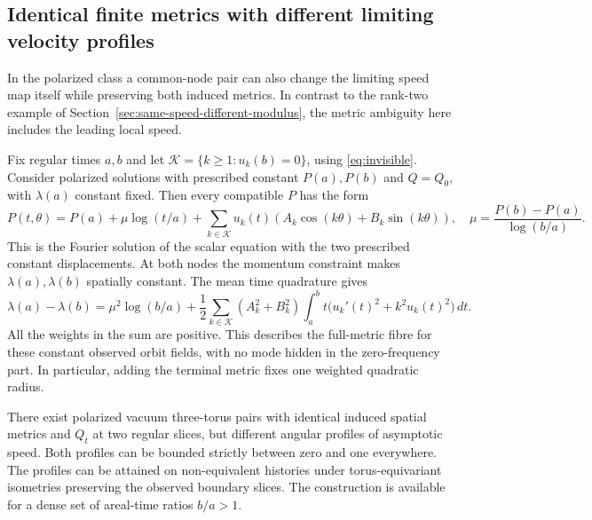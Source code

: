 \subsection{Identical finite metrics with different limiting velocity profiles}
\label{sec:different-velocity-same-metrics}
In the polarized class a common-node pair can also change
the limiting speed map itself while preserving both
induced metrics. In contrast to the rank-two example of
Section~\ref{sec:same-speed-different-modulus}, the
metric ambiguity here includes the leading local speed.

Fix regular times $a,b$ and let
$\mathcal K=\{k\ge1:u_k(b)=0\}$, using
\eqref{eq:invisible}. Consider polarized solutions
with prescribed constant $P(a),P(b)$ and $Q=Q_0$,
with $\lambda(a)$ constant fixed.
Then every compatible $P$ has the form
\begin{equation}
 P(t,\theta)=P(a)+\mu\log(t/a)+
 \sum_{k\in\mathcal K}u_k(t)
       (A_k\cos(k\theta)+B_k\sin(k\theta)),
 \quad \mu=\frac{P(b)-P(a)}{\log(b/a)}.
 \label{eq:polarized-fibre}
\end{equation}
This is the Fourier solution of the scalar equation
with the two prescribed constant displacements.
At both nodes the momentum constraint makes
$\lambda(a),\lambda(b)$ spatially constant.
The mean time quadrature gives
\begin{equation}
 \lambda(a)-\lambda(b)
  =\mu^2\log(b/a)+
     \frac12\sum_{k\in\mathcal K}(A_k^2+B_k^2)
         \int_a^b t\big(u_k'(t)^2+k^2u_k(t)^2\big)\,dt .
 \label{eq:fibre-energy}
\end{equation}
All the weights in the sum are positive.
This describes the full-metric fibre for
these constant observed orbit fields, with no
mode hidden in the zero-frequency part.
In particular, adding the terminal metric
fixes one weighted quadratic radius.

\begin{proposition}
\label{prop:different-velocity-same-metrics}
There exist polarized vacuum three-torus pairs with
identical induced spatial metrics and $Q_t$ at two
regular slices, but different angular profiles of
asymptotic speed. Both profiles can be bounded
strictly between zero and one everywhere.
The profiles can be attained on non-equivalent
histories under torus-equivariant isometries
preserving the observed boundary slices.
The construction is available for a dense set of
areal-time ratios $b/a>1$.
\end{proposition}

